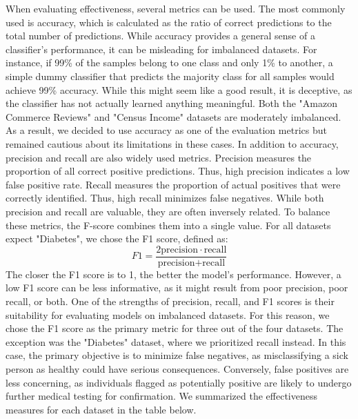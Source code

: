 \documentclass[a4paper,10pt]{article}
\begin{document}
When evaluating effectiveness, several metrics can be used. The most commonly used is accuracy, which is calculated as the ratio of correct predictions to the total number of predictions. While accuracy provides a general sense of a classifier’s performance, it can be misleading for imbalanced datasets. For instance, if 99\% of the samples belong to one class and only 1\% to another, a simple dummy classifier that predicts the majority class for all samples would achieve 99\% accuracy. While this might seem like a good result, it is deceptive, as the classifier has not actually learned anything meaningful. Both the "Amazon Commerce Reviews" and "Census Income" datasets are moderately imbalanced. As a result, we decided to use accuracy as one of the evaluation metrics but remained cautious about its limitations in these cases. In addition to accuracy, precision and recall are also widely used metrics. Precision measures the proportion of all correct positive predictions. Thus, high precision indicates a low false positive rate. Recall measures the proportion of actual positives that were correctly identified. Thus, high recall minimizes false negatives. While both precision and recall are valuable, they are often inversely related. To balance these metrics, the F-score combines them into a single value. For all datasets expect "Diabetes", we chose the F1 score, defined as:
\begin{equation*}
    F1=\frac{2 \text{precision} \cdot \text{recall}}{\text{precision} + \text{recall}}
\end{equation*}
The closer the F1 score is to 1, the better the model's performance. However, a low F1 score can be less informative, as it might result from poor precision, poor recall, or both. One of the strengths of precision, recall, and F1 scores is their suitability for evaluating models on imbalanced datasets. For this reason, we chose the F1 score as the primary metric for three out of the four datasets. The exception was the "Diabetes" dataset, where we prioritized recall instead. In this case, the primary objective is to minimize false negatives, as misclassifying a sick person as healthy could have serious consequences. Conversely, false positives are less concerning, as individuals flagged as potentially positive are likely to undergo further medical testing for confirmation. We summarized the effectiveness measures for each dataset in the table below.
\end{document}
